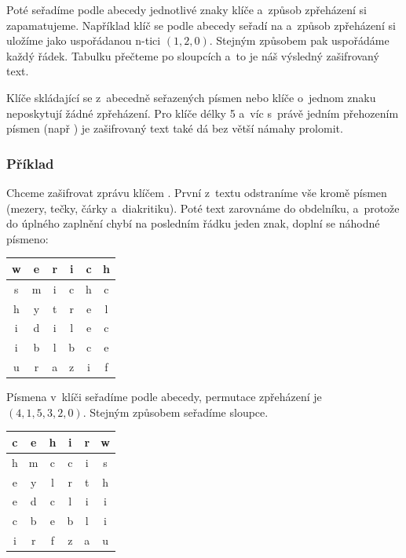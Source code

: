 \documentclass[glossaries, index]{kidiplom}
\begin{document}
Poté seřadíme podle abecedy jednotlivé znaky klíče a~způsob zpřeházení si zapamatujeme. Například klíč  se podle abecedy seřadí na  a~způsob zpřeházení si uložíme jako uspořádanou n-tici $(1, 2, 0)$. Stejným způsobem pak uspořádáme každý řádek. Tabulku přečteme po sloupcích a~to je náš výsledný zašifrovaný text.

Klíče skládající se z~abecedně seřazených písmen nebo klíče o~jednom znaku neposkytují žádné zpřeházení. Pro klíče délky 5 a~víc s~právě jedním přehozením písmen (např ) je zašifrovaný text také dá bez větší námahy prolomit.

\subsubsection{Příklad}
Chceme zašifrovat zprávu  klíčem . První z~textu odstraníme vše kromě písmen (mezery, tečky, čárky a~diakritiku). Poté text zarovnáme do obdelníku, a~protože do úplného zaplnění chybí na posledním řádku jeden znak, doplní se náhodné písmeno:

\begin{center}
\begin{tabular}{ c c c c c c }
  w & e & r & i & c & h \\ \hline \hline
  s & m & i & c & h & c \\
  h & y & t & r & e & l \\
  i & d & i & l & e & c \\
  i & b & l & b & c & e \\
  u & r & a & z & i & f \\
\end{tabular}
\end{center}

Písmena v~klíči seřadíme podle abecedy, permutace zpřeházení je $(4, 1, 5, 3, 2, 0)$. Stejným způsobem seřadíme sloupce.

\begin{center}
\begin{tabular}{ c c c c c c }
  c & e & h & i & r & w \\ \hline \hline
  h & m & c & c & i & s \\
  e & y & l & r & t & h \\
  e & d & c & l & i & i \\
  c & b & e & b & l & i \\
  i & r & f & z & a & u \\
\end{tabular}
\end{center}
\end{document}
